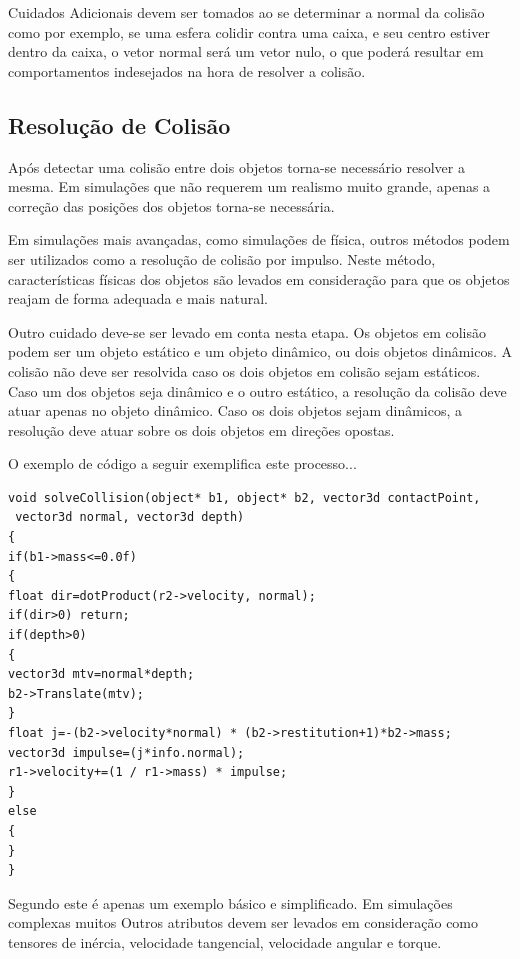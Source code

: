 Cuidados Adicionais devem ser tomados ao se determinar a normal da colisão como
por exemplo, se uma esfera colidir contra uma caixa, e seu centro estiver
dentro da caixa, o vetor normal será um vetor nulo, o que poderá resultar em
comportamentos indesejados na hora de resolver a colisão.

\subsection{Resolução de Colisão}

Após detectar uma colisão entre dois objetos torna-se necessário resolver
a mesma. Em simulações que não requerem um realismo muito grande, apenas a
correção das posições dos objetos torna-se necessária.

Em simulações mais avançadas, como simulações de física, outros métodos podem
ser utilizados como a resolução de colisão por impulso.
Neste método, características físicas dos objetos são levados em consideração
para que os objetos reajam de forma adequada e mais natural.

Outro cuidado deve-se ser levado em conta nesta etapa.
Os objetos em colisão podem ser um objeto estático e um objeto dinâmico, ou
dois objetos dinâmicos. A colisão não deve ser resolvida caso os dois objetos
em colisão sejam estáticos.
Caso um dos objetos seja dinâmico e o outro estático, a resolução da colisão
deve atuar apenas no objeto dinâmico.
Caso os dois objetos sejam dinâmicos, a resolução deve atuar sobre os dois
objetos em direções opostas.

O exemplo de código a seguir exemplifica este processo...


\begin{lstlisting}[frame=single,caption=Exemplo de resolução de colisão\label{code:solveCollision}]
void solveCollision(object* b1, object* b2, vector3d contactPoint,
 vector3d normal, vector3d depth)
{
if(b1->mass<=0.0f)
{
float dir=dotProduct(r2->velocity, normal);
if(dir>0) return;
if(depth>0)
{
vector3d mtv=normal*depth;
b2->Translate(mtv);
}
float j=-(b2->velocity*normal) * (b2->restitution+1)*b2->mass;
vector3d impulse=(j*info.normal);
r1->velocity+=(1 / r1->mass) * impulse;
}
else
{
}
}
\end{lstlisting}

Segundo  este é apenas um exemplo básico e simplificado. Em simulações complexas muitos Outros atributos devem ser levados em consideração como tensores de inércia, velocidade tangencial, velocidade angular e torque.

